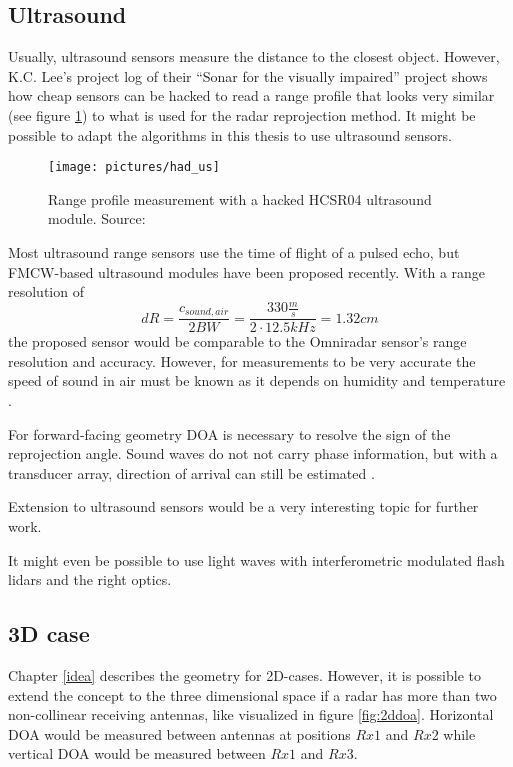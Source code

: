 \subsection{Ultrasound}\label{ultrasound}

Usually, ultrasound sensors measure the distance to the closest object.
However, K.C. Lee's project log of their ``Sonar for the visually
impaired'' project \cite{Lee2015} shows how cheap sensors can be hacked
to read a range profile that looks very similar (see figure \cref{fig:had_us}) to
what is used for the radar reprojection method. It might be possible to
adapt the algorithms in this thesis to use ultrasound sensors.

\begin{figure}[htp]
    \centering
    \texttt{[image: pictures/had\_us]}
    \caption{\label{fig:had_us}Range profile measurement with a hacked HCSR04 ultrasound module. Source: \cite{Lee2015}}
\end{figure}

Most ultrasound range sensors use the time of flight of a pulsed echo,
but FMCW-based ultrasound modules have been proposed
\cite{Battaglini2014} recently. With a range resolution of
\[dR = \frac{c_{sound, air}}{2 BW} = \frac{330 \frac{m}{s}}{2\cdot 12.5kHz} = 1.32 cm\]
the proposed sensor would be comparable to the Omniradar sensor's range
resolution and accuracy. However, for measurements to be very accurate
the speed of sound in air must be known as it depends on humidity and
temperature \cite{Bohn1987}.

For forward-facing geometry DOA is necessary to resolve the sign of the
reprojection angle. Sound waves do not not carry phase information, but
with a transducer array, direction of arrival can still be estimated
\cite{Kunin2010}.

Extension to ultrasound sensors would be a very interesting topic for
further work.

It might even be possible to use light waves with interferometric
modulated flash lidars and the right optics.

\subsection{3D case}\label{d-case}

Chapter \cref{idea} describes the geometry for 2D-cases. However, it
is possible to extend the concept to the three dimensional space if a
radar has more than two non-collinear receiving antennas, like
visualized in figure \cref{fig:2ddoa}. Horizontal DOA would be measured between
antennas at positions \(Rx1\) and \(Rx2\) while vertical DOA would be
measured between \(Rx1\) and \(Rx3\).

